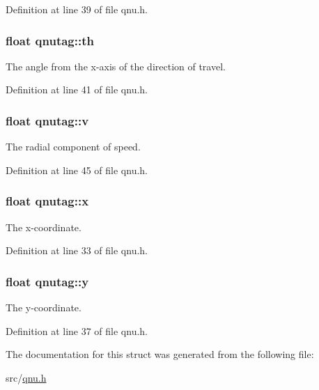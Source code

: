 Definition at line 39 of file qnu.\-h.

\hypertarget{structqnutag_a94e6da5d70df2be6f958b180decd55c7}{
\subsubsection[{th}]{\setlength{\rightskip}{0pt plus 5cm}float qnutag\-::th}}\label{structqnutag_a94e6da5d70df2be6f958b180decd55c7}


The angle from the x-\/axis of the direction of travel. 



Definition at line 41 of file qnu.\-h.

\hypertarget{structqnutag_a98c6a8196d4f9ea5f718938beb02bfb0}{
\subsubsection[{v}]{\setlength{\rightskip}{0pt plus 5cm}float qnutag\-::v}}\label{structqnutag_a98c6a8196d4f9ea5f718938beb02bfb0}


The radial component of speed. 



Definition at line 45 of file qnu.\-h.

\hypertarget{structqnutag_a32ef71f6513fa30bd13b1d005642b93b}{
\subsubsection[{x}]{\setlength{\rightskip}{0pt plus 5cm}float qnutag\-::x}}\label{structqnutag_a32ef71f6513fa30bd13b1d005642b93b}


The x-\/coordinate. 



Definition at line 33 of file qnu.\-h.

\hypertarget{structqnutag_a1bdb6dfd08730c13494c9300a09028fa}{
\subsubsection[{y}]{\setlength{\rightskip}{0pt plus 5cm}float qnutag\-::y}}\label{structqnutag_a1bdb6dfd08730c13494c9300a09028fa}


The y-\/coordinate. 



Definition at line 37 of file qnu.\-h.



The documentation for this struct was generated from the following file\-:\begin{DoxyCompactItemize}
\item 
src/\hyperlink{qnu_8h}{qnu.\-h}\end{DoxyCompactItemize}
